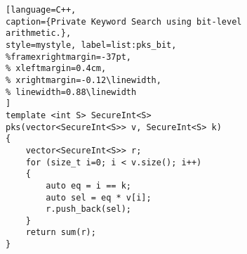 \begin{figure}[h]

\noindent\begin{minipage}{.50\textwidth}
\begin{lstlisting}[language=C++,
caption={Private Keyword Search using bit-level arithmetic.},
style=mystyle, label=list:pks_bit,
%framexrightmargin=-37pt,
% xleftmargin=0.4cm,
% xrightmargin=-0.12\linewidth,
% linewidth=0.88\linewidth
]
template <int S> SecureInt<S>
pks(vector<SecureInt<S>> v, SecureInt<S> k)
{
    vector<SecureInt<S>> r;
    for (size_t i=0; i < v.size(); i++)
    {
        auto eq = i == k;
        auto sel = eq * v[i];
        r.push_back(sel);
    }
    return sum(r);
}
\end{lstlisting}
\end{minipage}


\end{figure}
